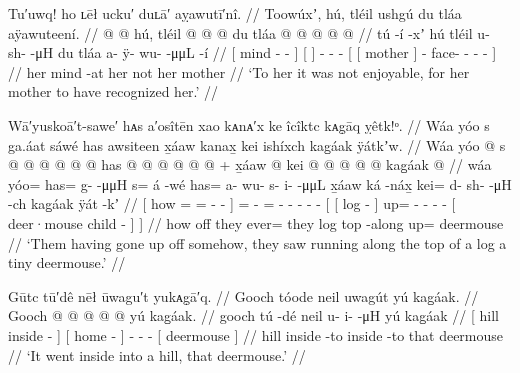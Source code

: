 \ex\label{ex:92-61-no-fun-if-mother-recognized}%
%
\begingl
	\glpreamble	Tu′uwq! ho ʟēł ucku′ duʟā′ aỵawutī′nî. //
	\glpreamble	Toowúxʼ, hú, tléil ushgú du tláa aÿawuteení. //
	\gla	{} {}  @ {} @ {} {}
		{} hú, {}
		tléil  @ {} @ {} @ {}
		{} {} du tláa {}
			 @ {} @ {} @ {} @ {} @ {} {} //
	\glb	{} {} tú -í -xʼ {}
		{} hú {}
		tléil u- sh-  -μH
		{} {} du tláa {}
			a- ÿ- wu-  -μμL -í {} //
	\glc	{}[  mind - - {}]
		{}[  {}]
		 - -  -
		{}[ {}[  mother {}]
			- face- -  - - {}] //
	\gld	{} her mind {} -at {}
		{} her {}
		not  {} {} {}
		{} {} her mother {}
			 {} {} {} {} {} {} //
	\glft	‘To her it was not enjoyable, for her mother to have recognized her.’
		//
\endgl
\xe

\ex\label{ex:92-62-gone-up-off-saw-deermouse-on-log}%
%
\begingl
	\glpreamble	Wā′yuskoā′t-sawe′ hᴀs a′osîtēn xao kᴀnᴀ′x ke îcîktc kᴀg̣āq ỵêtk!ᵒ. //
	\glpreamble	Wáa yóo s ga.áat sáwé has awsiteen x̱áaw kanax̱ kei ishíxch kag̱áak ÿátkʼw. //
	\gla	{} Wáa yóo @ s @  @ {} @ {} @ {} {}
		 @ {} @ {}
		has @  @ {} @ {} @ {} @ {} @ {} +
		{} {} x̱áaw  @ {} {}
			kei @  @ {} @ {} @ {} @ {}
			{} kag̱áak  @ {} {} {} //
	\glb	{} wáa yóo= has= g-  -μμH {} {}
		s= á -wé
		has= a- wu- s- i-  -μμL
		{} {} x̱áaw ká -náx̱ {}
			kei= d- sh-  -μH -ch
			{} kag̱áak ÿát -kʼ {} {} //
	\glc	{}[ how = = -
			 - \· {}]
		=  -
		= - - - -  -
		{}[ {}[ log  - {}]
			up= - -  - -
			{}[ deer·mouse child - {}] {}] //
	\gld	{} how off they  {} {} {} {}
		ever=  {}
		they  {} {} {} {} {}
		{} {} log top -along {}
			up=  {} {} {} {}
			{} deermouse  {} {} {} //
	\glft	‘Them having gone up off somehow, they saw running along the top of a log a tiny deermouse.’
		//
\endgl
\xe

\ex\label{ex:92-63-went-inside-of-a-hill}%
%
\begingl
	\glpreamble	Gūtc tū′dê nēł ūwagu′t yukᴀg̣ā′q. //
	\glpreamble	Gooch tóode neil uwagút yú kag̱áak. //
	\gla	{} Gooch  @ {} {} {}  @ {} {}
		 @ {} @ {} @ {}
		{} yú kag̱áak. {} //
	\glb	{} gooch tú -dé {} {} neil {} {}
		u- i-  -μH
		{} yú kag̱áak {} //
	\glc	{}[ hill inside - {}] {}[ home - {}]
		- -  -
		{}[  deermouse {}] //
	\gld	{} hill inside -to {} {} inside -to {}
		 {} {} {}
		{} that deermouse {} //
	\glft	‘It went inside into a hill, that deermouse.’
		//
\endgl
\xe


